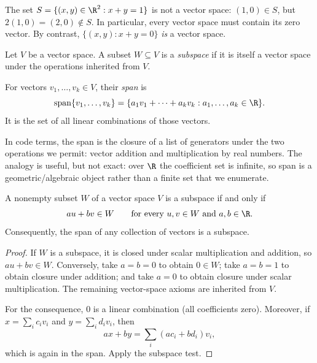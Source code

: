 \begin{example}
The set $S=\{(x,y)\in\R^2:x+y=1\}$ is not a vector space: $(1,0)\in S$, but $2(1,0)=(2,0)\notin S$. In particular, every vector space must contain its zero vector. By contrast, $\{(x,y):x+y=0\}$ \emph{is} a vector space.
\end{example}

\begin{definition}
Let $V$ be a vector space. A subset $W\subseteq V$ is a \emph{subspace} if it is itself a vector space under the operations inherited from $V$.

For vectors $v_1,\ldots,v_k\in V$, their \emph{span} is
\[
  \operatorname{span}\{v_1,\ldots,v_k\}=\{a_1v_1+\cdots+a_kv_k:a_1,\ldots,a_k\in\R\}.
\]
It is the set of all linear combinations of those vectors.
\end{definition}

In code terms, the span is the closure of a list of generators under the two operations we permit: vector addition and multiplication by real numbers. The analogy is useful, but not exact: over $\R$ the coefficient set is infinite, so span is a geometric/algebraic object rather than a finite set that we enumerate.

\begin{theorem}\label{thm:subspace-test}
A nonempty subset $W$ of a vector space $V$ is a subspace if and only if
\[
  au+bv\in W \qquad\text{for every }u,v\in W\text{ and }a,b\in\R.
\]
Consequently, the span of any collection of vectors is a subspace.
\end{theorem}

\begin{proof}
If $W$ is a subspace, it is closed under scalar multiplication and addition, so $au+bv\in W$. Conversely, take $a=b=0$ to obtain $0\in W$; take $a=b=1$ to obtain closure under addition; and take $a=0$ to obtain closure under scalar multiplication. The remaining vector-space axioms are inherited from $V$.

For the consequence, $0$ is a linear combination (all coefficients zero). Moreover, if $x=\sum_i c_iv_i$ and $y=\sum_i d_iv_i$, then
\[
  ax+by=\sum_i(ac_i+bd_i)v_i,
\]
which is again in the span. Apply the subspace test.
\end{proof}

